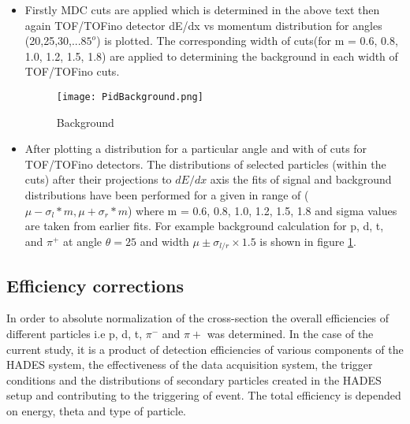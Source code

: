 \begin{itemize}
	\item Firstly MDC cuts are applied which is determined in the above text then again TOF/TOFino detector dE/dx vs momentum distribution for angles (20,25,30,...$85^o$)  is plotted. The corresponding width of cuts(for m = 0.6, 0.8, 1.0, 1.2, 1.5, 1.8) are applied to determining the background in each width of TOF/TOFino cuts.
	\begin{figure}
		\centering
		\texttt{[image: PidBackground.png]}
		\caption{Background}
		\label{backg}
	\end{figure}  
	\item After plotting a distribution for a particular angle and with of cuts for TOF/TOFino detectors. The distributions of selected particles (within the cuts) after their projections to $dE/dx$ axis the fits of signal and background distributions have been performed for a given in range of ($\mu-\sigma_l*m , \mu+\sigma_r*m$) where m = 0.6, 0.8, 1.0, 1.2, 1.5, 1.8 and sigma values are taken from earlier fits. For example background calculation for p, d, t, and $\pi^+$ at angle $\theta=25$ and width $\mu \pm \sigma_{l/r}\times1.5$ is shown in figure \ref{backg}.
	
\end{itemize}



\subsection{\label{Eff_corr} Efficiency corrections}
In order to absolute normalization of the cross-section the overall efficiencies of different particles i.e p, d, t, $\pi^-$ and $\pi+$ was determined. In the case of the current study, it is a product of detection efficiencies of various components of the HADES system, the effectiveness of the data acquisition system, the trigger conditions and the distributions of secondary particles created in the HADES setup and contributing to the triggering of event. The total efficiency is depended on energy, theta and type of particle.\par


